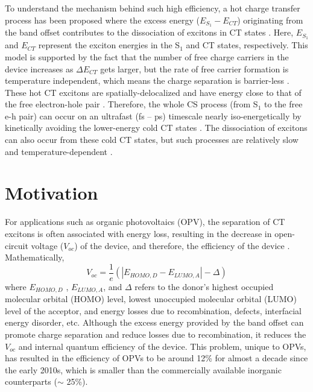 \documentclass[12pt]{article}
\begin{document}
To understand the mechanism behind such high efficiency, a hot charge transfer process has been proposed where the excess energy ($E_{S_1} - E_{CT}$) originating from the band offset contributes to the dissociation of excitons in CT states \cite{clarke2010charge}. Here, $E_{S_1}$ and $E_{CT}$ represent the exciton energies in the S$_1$ and CT states, respectively. This model is supported by the fact that the number of free charge
carriers in the device increases as $\Delta E_{CT}$ gets larger, but the rate of free carrier formation is temperature independent, which means the charge separation is barrier-less \cite{ohkita2008charge,clarke2008free,pensack2009barrierless}. These 
 hot CT excitons are spatially-delocalized and have energy close to that of the free electron-hole pair \cite{grancini2013hot,jailaubekov2013hot,gelinas2014ultrafast,savoie2014unequal}. Therefore, the whole CS process (from S$_1$ to the free e-h pair) can occur on an ultrafast (fs – ps) 
 timescale nearly iso-energetically by kinetically avoiding the lower-energy cold CT states \cite{grancini2013hot,jailaubekov2013hot,gelinas2014ultrafast,savoie2014unequal}. The dissociation of excitons can also occur from these cold CT states, but such processes are relatively slow and temperature-dependent \cite{bernede2008organic,gautam2016charge,athanasopoulos2017efficient,fazzi2017hot}.


\section{Motivation}
For applications such as organic photovoltaics (OPV), the separation of CT excitons is often associated with energy loss, resulting in the decrease in open-circuit voltage ($V_{oc}$) of the device, and therefore, the efficiency of the device \cite{yao2015quantifying,rand2007offset,liu2019engineering}. Mathematically, 
\begin{equation}
   V_{oc} = \frac{1}{e}( |E_{HOMO,D} - E_{LUMO,A}| - \Delta)
\end{equation}
 where $E_{HOMO,D}$ , $E_{LUMO,A}$, and $\Delta$ refers to the donor's highest occupied molecular orbital (HOMO) level, lowest unoccupied molecular orbital (LUMO) level of the acceptor, and energy losses due to recombination, defects, interfacial energy disorder, etc. Although the excess energy provided by the band offset can promote charge separation and reduce losses due to recombination, it reduces the $V_{oc}$ and internal quantum efficiency of the device. This problem, unique to OPVs, has resulted in the efficiency of OPVs to be around 12\% for almost a decade since the early 2010s, which is smaller than the commercially available inorganic counterparts ($\sim$ 25\%).
\end{document}
